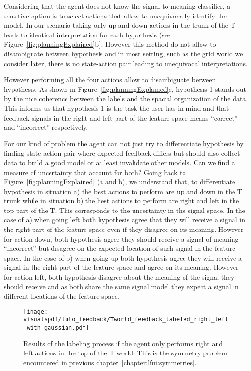 Considering that the agent does not know the signal to meaning classifier, a sensitive option is to select actions that allow to unequivocally identify the model. In our scenario taking only up and down actions in the trunk of the T leads to identical interpretation for each hypothesis (see Figure~\ref{fig:planningExplained}b). However this method do not allow to disambiguate between hypothesis and in most setting, such as the grid world we consider later, there is no state-action pair leading to unequivocal interpretations.

However performing all the four actions allow to disambiguate between hypothesis. As shown in Figure~\ref{fig:planningExplained}c, hypothesis 1 stands out by the nice coherence between the labels and the spacial organization of the data. This informs us that hypothesis 1 is the task the user has in mind and that feedback signals in the right and left part of the feature space means ``correct'' and ``incorrect'' respectively.

For our kind of problem the agent can not just try to differentiate hypothesis by finding state-action pair where expected feedback differs but should also collect data to build a good model or at least invalidate other models. Can we find a measure of uncertainty that account for both? Going back to Figure~\ref{fig:planningExplained} (a and b), we understand that, to differentiate hypothesis in situation a) the best actions to perform are up and down in the T trunk while in situation b) the best actions to perform are right and left in the top part of the T. This corresponds to the uncertainty in the signal space. In the case of a) when going left both hypothesis agree that they will receive a signal in the right part of the feature space even if they disagree on its meaning. However for action down, both hypothesis agree they should receive a signal of meaning ``incorrect'' but disagree on the expected location of such signal in the feature space. In the case of b) when going up both hypothesis agree they will receive a signal in the right part of the feature space and agree on its meaning. However for action left, both hypothesis disagree about the meaning of the signal they should receive and as both share the same signal model they expect a signal in different locations of the feature space.


\begin{figure}[!ht]
  \centering
  \texttt{[image: \\visualspdf/tuto\_feedback/Tworld\_feedback\_labeled\_right\_left\_with\_gaussian.pdf]}
  \caption{Results of the labeling process if the agent only performs right and left actions in the top of the T world. This is the symmetry problem encountered in previous chapter~\ref{chapter:lfui:symmetries}.}
  \label{fig:planningrightleft}
\end{figure}

